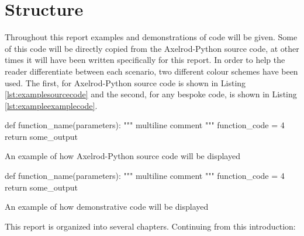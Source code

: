 \section{Structure}

Throughout this report examples and demonstrations of code will be given.
Some of this code will be directly copied from the Axelrod-Python source code, at other times it will have been written specifically for this report.
In order to help the reader differentiate between each scenario, two different colour schemes have been used.
The first, for Axelrod-Python source code is shown in Listing \ref{lst:examplesourcecode} and the second, for any bespoke code, is shown in Listing \ref{lst:exampleexamplecode}.

\begin{listing}[hbtp!]
\begin{SourceCode}
def function_name(parameters):
    """
    multiline comment
    """
    function_code = 4
    return some_output
\end{SourceCode}
\caption{An example of how Axelrod-Python source code will be displayed}
\label{lst:examplesourcecode}
\end{listing}

\begin{listing}[hbtp!]
\begin{ExampleCode}
def function_name(parameters):
    """
    multiline comment
    """
    function_code = 4
    return some_output
\end{ExampleCode}
\caption{An example of how demonstrative code will be displayed}
\label{lst:exampleexamplecode}
\end{listing}{}

This report is organized into several chapters. Continuing from this introduction:


